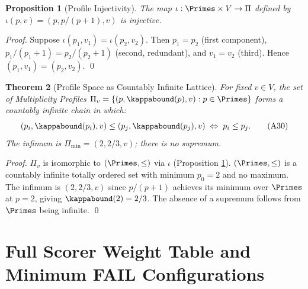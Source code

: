 \documentclass[11pt,letterpaper]{article}
\newtheorem{theorem}{Theorem}[section]
\newtheorem{proposition}[theorem]{Proposition}
\theoremstyle{remark}
\begin{document}
\begin{proposition}[Profile Injectivity]
\label{prop:profile-inject}
The map $\iota: \Primes \times V \to \Pi$ defined by
$\iota(p, v) = (p, p/(p+1), v)$ is injective.
\end{proposition}

\begin{proof}
Suppose $\iota(p_1, v_1) = \iota(p_2, v_2)$.  Then
$p_1 = p_2$ (first component), $p_1/(p_1+1) = p_2/(p_2+1)$ (second,
redundant), and $v_1 = v_2$ (third).  Hence $(p_1, v_1) = (p_2, v_2)$. \qed
\end{proof}

\begin{theorem}[Profile Space as Countably Infinite Lattice]
\label{thm:profile-lattice}
For fixed $v \in V$, the set of Multiplicity Profiles
$\Pi_v = \{(p, \kappabound(p), v) : p \in \Primes\}$ forms a
countably infinite chain in which:
\[
  (p_i, \kappabound(p_i), v) \leq (p_j, \kappabound(p_j), v)
  \;\Leftrightarrow\; p_i \leq p_j. \tag{A30}
\]
The infimum is $\Pi_{\min} = (2, 2/3, v)$; there is no supremum.
\end{theorem}

\begin{proof}
$\Pi_v$ is isomorphic to $(\Primes, \leq)$ via $\iota$ (Proposition
\ref{prop:profile-inject}).  $(\Primes, \leq)$ is a countably infinite
totally ordered set with minimum $p_0 = 2$ and no maximum.  The
infimum is $(2, 2/3, v)$ since $p/(p+1)$ achieves its minimum over
$\Primes$ at $p = 2$, giving $\kappabound(2) = 2/3$.  The absence of a
supremum follows from $\Primes$ being infinite. \qed
\end{proof}

\section{Full Scorer Weight Table and Minimum FAIL Configurations}
\label{sec:scorer-table}
\end{document}
